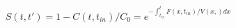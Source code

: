 \begin{equation}
S(t,t') = 1-C(t,t_{in})/C_0 = e^{-\int_{t_{in}}^t F(x,t_{in})/V(x,) dx}
\end{equation}